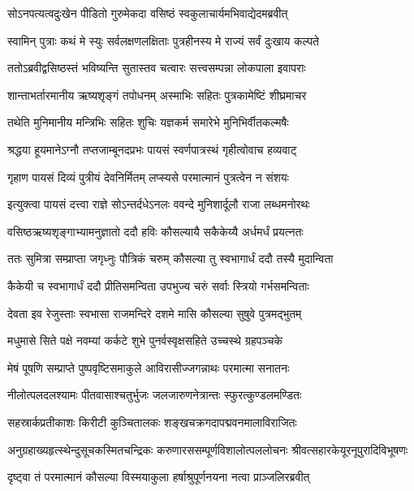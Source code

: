 \twolineshloka
{सोऽनपत्यत्वदुःखेन पीडितो गुरुमेकदा}
{वसिष्ठं स्वकुलाचार्यमभिवाद्येदमब्रवीत्} %

\twolineshloka
{स्वामिन् पुत्राः कथं मे स्युः सर्वलक्षणलक्षिताः}
{पुत्रहीनस्य मे राज्यं सर्वं दुःखाय कल्पते} %

\twolineshloka
{ततोऽब्रवीद्वसिष्ठस्तं भविष्यन्ति सुतास्तव}
{चत्वारः सत्त्वसम्पन्ना लोकपाला इवापराः} %

\twolineshloka
{शान्ताभर्तारमानीय ऋष्यशृङ्गं तपोधनम्}
{अस्माभिः सहितः पुत्रकामेष्टिं शीघ्रमाचर} %

\twolineshloka
{तथेति मुनिमानीय मन्त्रिभिः सहितः शुचिः}
{यज्ञकर्म समारेभे मुनिभिर्वीतकल्मषैः} %

\twolineshloka
{श्रद्धया हूयमानेऽग्नौ तप्तजाम्बूनदप्रभः}
{पायसं स्वर्णपात्रस्थं गृहीत्वोवाच हव्यवाट्} %

\twolineshloka
{गृहाण पायसं दिव्यं पुत्रीयं देवनिर्मितम्}
{लप्स्यसे परमात्मानं पुत्रत्वेन न संशयः} %

\twolineshloka
{इत्युक्त्वा पायसं दत्त्वा राज्ञे सोऽन्तर्दधेऽनलः}
{ववन्दे मुनिशार्दूलौ राजा लब्धमनोरथः} %

\twolineshloka
{वसिष्ठऋष्यशृङ्गाभ्यामनुज्ञातो ददौ हविः}
{कौसल्यायै सकैकेय्यै अर्धमर्धं प्रयत्नतः} %

\twolineshloka
{ततः सुमित्रा सम्प्राप्ता जगृध्नुः पौत्रिकं चरुम्}
{कौसल्या तु स्वभागार्धं ददौ तस्यै मुदान्विता} %

\twolineshloka
{कैकेयी च स्वभागार्धं ददौ प्रीतिसमन्विता}
{उपभुज्य चरुं सर्वाः स्त्रियो गर्भसमन्विताः} %

\twolineshloka
{देवता इव रेजुस्ताः स्वभासा राजमन्दिरे}
{दशमे मासि कौसल्या सुषुवे पुत्रमद्भुतम्} %

\twolineshloka
{मधुमासे सिते पक्षे नवम्यां कर्कटे शुभे}
{पुनर्वस्वृक्षसहिते उच्चस्थे ग्रहपञ्चके} %

\twolineshloka
{मेषं पूषणि सम्प्राप्ते पुष्पवृष्टिसमाकुले}
{आविरासीज्जगन्नाथः परमात्मा सनातनः} %

\twolineshloka
{नीलोत्पलदलश्यामः पीतवासाश्चतुर्भुजः}
{जलजारुणनेत्रान्तः स्फुरत्कुण्डलमण्डितः} %

\twolineshloka
{सहस्रार्कप्रतीकाशः किरीटी कुञ्चितालकः}
{शङ्खचक्रगदापद्मवनमालाविराजितः} %

\threelineshloka
{अनुग्रहाख्यहृत्स्थेन्दुसूचकस्मितचन्द्रिकः}
{करुणारससम्पूर्णविशालोत्पललोचनः}
{श्रीवत्सहारकेयूरनूपुरादिविभूषणः} %

\twolineshloka
{दृष्ट्वा तं परमात्मानं कौसल्या विस्मयाकुला}
{हर्षाश्रुपूर्णनयना नत्वा प्राञ्जलिरब्रवीत्} %

